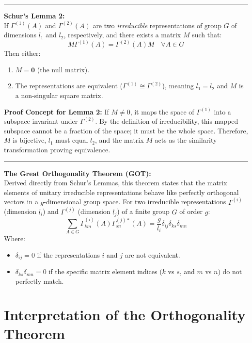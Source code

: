 \documentclass[11pt, a4paper]{report}
\begin{document}
\vspace{1em}
\hrule
\vspace{1em}

\textbf{Schur's Lemma 2:}\\
If $\Gamma^{(1)}(A)$ and $\Gamma^{(2)}(A)$ are two \textit{irreducible} representations of group $G$ of dimensions $l_1$ and $l_2$, respectively, and there exists a matrix $M$ such that:
\[ M \Gamma^{(1)}(A) = \Gamma^{(2)}(A) M \quad \forall A \in G \]
Then either:
\begin{enumerate}
    \item $M = \mathbf{0}$ (the null matrix).
    \item The representations are equivalent ($\Gamma^{(1)} \cong \Gamma^{(2)}$), meaning $l_1 = l_2$ and $M$ is a non-singular square matrix.
\end{enumerate}

\textbf{Proof Concept for Lemma 2:} If $M \neq 0$, it maps the space of $\Gamma^{(1)}$ into a subspace invariant under $\Gamma^{(2)}$. By the definition of irreducibility, this mapped subspace cannot be a fraction of the space; it must be the whole space. Therefore, $M$ is bijective, $l_1$ must equal $l_2$, and the matrix $M$ acts as the similarity transformation proving equivalence.

\vspace{1em}
\hrule
\vspace{1em}

\textbf{The Great Orthogonality Theorem (GOT):}\\
Derived directly from Schur's Lemmas, this theorem states that the matrix elements of unitary irreducible representations behave like perfectly orthogonal vectors in a $g$-dimensional group space.
For two irreducible representations $\Gamma^{(i)}$ (dimension $l_i$) and $\Gamma^{(j)}$ (dimension $l_j$) of a finite group $G$ of order $g$:
\[ \sum_{A \in G} \Gamma_{km}^{(i)}(A) \Gamma_{sn}^{(j)*}(A) = \frac{g}{l_i} \delta_{ij} \delta_{ks} \delta_{mn} \]
Where:
\begin{itemize}
    \item $\delta_{ij} = 0$ if the representations $i$ and $j$ are not equivalent.
    \item $\delta_{ks}\delta_{mn} = 0$ if the specific matrix element indices ($k$ vs $s$, and $m$ vs $n$) do not perfectly match.
\end{itemize}

\section{Interpretation of the Orthogonality Theorem}
\end{document}
